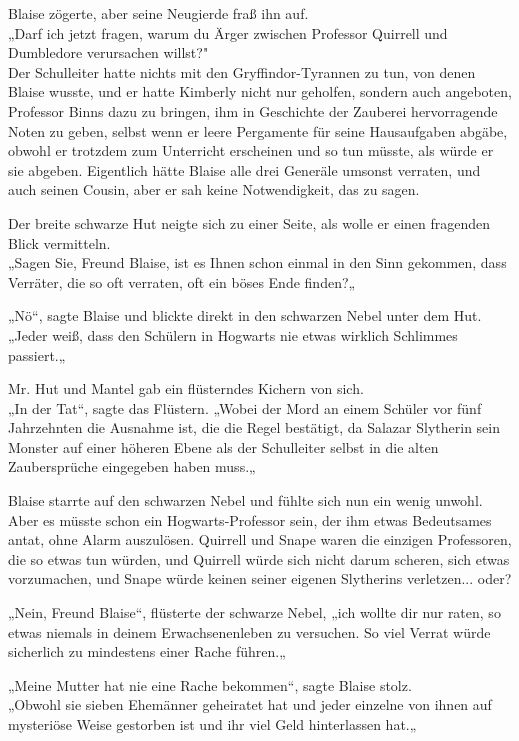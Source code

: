 {Blaise zögerte, aber seine Neugierde fraß ihn auf.\\ „Darf ich jetzt fragen, warum du Ärger zwischen Professor Quirrell und Dumbledore verursachen willst?"\\ Der Schulleiter hatte nichts mit den Gryffindor-Tyrannen zu tun, von denen Blaise wusste, und er hatte Kimberly nicht nur geholfen, sondern auch angeboten, Professor Binns dazu zu bringen, ihm in Geschichte der Zauberei hervorragende Noten zu geben, selbst wenn er leere Pergamente für seine Hausaufgaben abgäbe, obwohl er trotzdem zum Unterricht erscheinen und so tun müsste, als würde er sie abgeben. Eigentlich hätte Blaise alle drei Generäle umsonst verraten, und auch seinen Cousin, aber er sah keine Notwendigkeit, das zu sagen.

Der breite schwarze Hut neigte sich zu einer Seite, als wolle er einen fragenden Blick vermitteln.\\ „Sagen Sie, Freund Blaise, ist es Ihnen schon einmal in den Sinn gekommen, dass Verräter, die so oft verraten, oft ein böses Ende finden?„

„Nö“, sagte Blaise und blickte direkt in den schwarzen Nebel unter dem Hut.\\ „Jeder weiß, dass den Schülern in Hogwarts nie etwas wirklich Schlimmes passiert.„

Mr. Hut und Mantel gab ein flüsterndes Kichern von sich.\\ „In der Tat“, sagte das Flüstern. „Wobei der Mord an einem Schüler vor fünf Jahrzehnten die Ausnahme ist, die die Regel bestätigt, da Salazar Slytherin sein Monster auf einer höheren Ebene als der Schulleiter selbst in die alten Zaubersprüche eingegeben haben muss.„

Blaise starrte auf den schwarzen Nebel und fühlte sich nun ein wenig unwohl.\\ Aber es müsste schon ein Hogwarts-Professor sein, der ihm etwas Bedeutsames antat, ohne Alarm auszulösen. Quirrell und Snape waren die einzigen Professoren, die so etwas tun würden, und Quirrell würde sich nicht darum scheren, sich etwas vorzumachen, und Snape würde keinen seiner eigenen Slytherins verletzen... oder?

„Nein, Freund Blaise“, flüsterte der schwarze Nebel, „ich wollte dir nur raten, so etwas niemals in deinem Erwachsenenleben zu versuchen. So viel Verrat würde sicherlich zu mindestens einer Rache führen.„

„Meine Mutter hat nie eine Rache bekommen“, sagte Blaise stolz.\\ „Obwohl sie sieben Ehemänner geheiratet hat und jeder einzelne von ihnen auf mysteriöse Weise gestorben ist und ihr viel Geld hinterlassen hat.„

}
